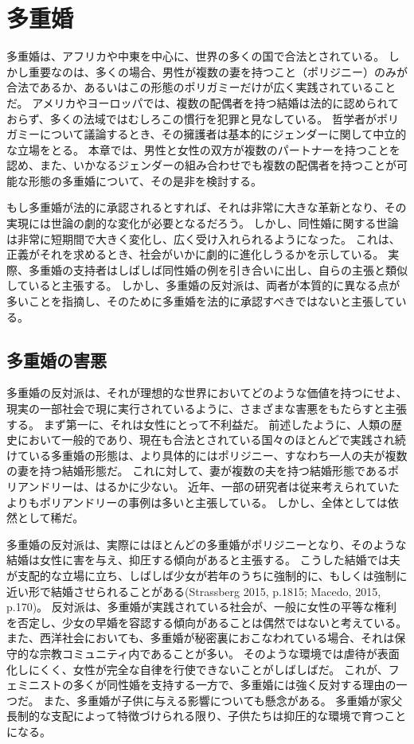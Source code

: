 \documentclass[paper=a4,book,openany]{jlreq} \usepackage{mystyle}
\begin{document}
\section{多重婚}

多重婚は、アフリカや中東を中心に、世界の多くの国で合法とされている。
しかし重要なのは、多くの場合、男性が複数の妻を持つこと（ポリジニー）のみが合法であるか、あるいはこの形態のポリガミーだけが広く実践されていることだ。
アメリカやヨーロッパでは、複数の配偶者を持つ結婚は法的に認められておらず、多くの法域ではむしろこの慣行を犯罪と見なしている。
哲学者がポリガミーについて議論するとき、その擁護者は基本的にジェンダーに関して中立的な立場をとる。
本章では、男性と女性の双方が複数のパートナーを持つことを認め、また、いかなるジェンダーの組み合わせでも複数の配偶者を持つことが可能な形態の多重婚について、その是非を検討する。

もし多重婚が法的に承認されるとすれば、それは非常に大きな革新となり、その実現には世論の劇的な変化が必要となるだろう。
しかし、同性婚に関する世論は非常に短期間で大きく変化し、広く受け入れられるようになった。
これは、正義がそれを求めるとき、社会がいかに劇的に進化しうるかを示している。
実際、多重婚の支持者はしばしば同性婚の例を引き合いに出し、自らの主張と類似していると主張する。
しかし、多重婚の反対派は、両者が本質的に異なる点が多いことを指摘し、そのために多重婚を法的に承認すべきではないと主張している。

\subsection{多重婚の害悪}

多重婚の反対派は、それが理想的な世界においてどのような価値を持つにせよ、現実の一部社会で現に実行されているように、さまざまな害悪をもたらすと主張する。
まず第一に、それは女性にとって不利益だ。
前述したように、人類の歴史において一般的であり、現在も合法とされている国々のほとんどで実践され続けている多重婚の形態は、より具体的にはポリジニー、すなわち一人の夫が複数の妻を持つ結婚形態だ。
これに対して、妻が複数の夫を持つ結婚形態であるポリアンドリーは、はるかに少ない。
近年、一部の研究者は従来考えられていたよりもポリアンドリーの事例は多いと主張している\citep{starkweather12:_survey_non_class_polyan}。
しかし、全体としては依然として稀だ。

多重婚の反対派は、実際にはほとんどの多重婚がポリジニーとなり、そのような結婚は女性に害を与え、抑圧する傾向があると主張する。
こうした結婚では夫が支配的な立場に立ち、しばしば少女が若年のうちに強制的に、もしくは強制に近い形で結婚させられることがある(Strassberg 2015, p.1815; Macedo, 2015, p.170)。
\nocite{strassberg15:_scrut_polyg}\nocite{macedo15:_just_married}
反対派は、多重婚が実践されている社会が、一般に女性の平等な権利を否定し、少女の早婚を容認する傾向があることは偶然ではないと考えている。
また、西洋社会においても、多重婚が秘密裏におこなわれている場合、それは保守的な宗教コミュニティ内であることが多い。
そのような環境では虐待が表面化しにくく、女性が完全な自律を行使できないことがしばしばだ。
これが、フェミニストの多くが同性婚を支持する一方で、多重婚には強く反対する理由の一つだ。
また、多重婚が子供に与える影響についても懸念がある。
多重婚が家父長制的な支配によって特徴づけられる限り、子供たちは抑圧的な環境で育つことになる。
\end{document}
